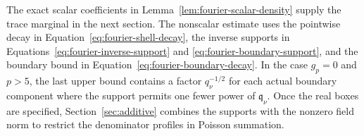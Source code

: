 The exact scalar coefficients in Lemma~\ref{lem:fourier-scalar-density}
supply the trace marginal in the next section.  The nonscalar estimate uses
the pointwise decay in Equation~\eqref{eq:fourier-shell-decay}, the inverse
supports in Equations~\eqref{eq:fourier-inverse-support} and
\eqref{eq:fourier-boundary-support}, and the boundary bound in
Equation~\eqref{eq:fourier-boundary-decay}.  In the case $g_p=0$ and $p>5$,
the last upper bound contains a factor $q_\nu^{-1/2}$ for each actual boundary
component where the support permits one fewer power of $\mathfrak q_\nu$.
Once the real boxes are specified, Section~\ref{sec:additive} combines the
supports with the nonzero field norm to restrict the denominator profiles in
Poisson summation.
